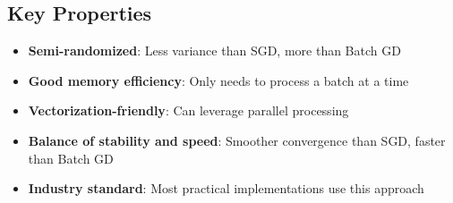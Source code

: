 \documentclass[
  letterpaper,
  DIV=11,
  numbers=noendperiod]{scrreprt}
\providecommand{\tightlist}{%
  \setlength{\itemsep}{0pt}\setlength{\parskip}{0pt}}\usepackage{longtable,booktabs,array}
\begin{document}
\subsection{Key Properties}\label{key-properties-2}

\begin{itemize}
\tightlist
\item
  \textbf{Semi-randomized}: Less variance than SGD, more than Batch GD
\item
  \textbf{Good memory efficiency}: Only needs to process a batch at a
  time
\item
  \textbf{Vectorization-friendly}: Can leverage parallel processing
\item
  \textbf{Balance of stability and speed}: Smoother convergence than
  SGD, faster than Batch GD
\item
  \textbf{Industry standard}: Most practical implementations use this
  approach
\end{itemize}
\end{document}
